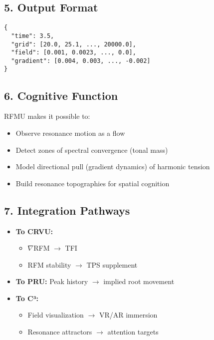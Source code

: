 \documentclass{article}
\begin{document}
\subsection*{5. Output Format}

\begin{verbatim}
{
  "time": 3.5,
  "grid": [20.0, 25.1, ..., 20000.0],
  "field": [0.001, 0.0023, ..., 0.0],
  "gradient": [0.004, 0.003, ..., -0.002]
}
\end{verbatim}

\subsection*{6. Cognitive Function}

RFMU makes it possible to:

\begin{itemize}
    \item Observe resonance motion as a flow
    \item Detect zones of spectral convergence (tonal mass)
    \item Model directional pull (gradient dynamics) of harmonic tension
    \item Build resonance topographies for spatial cognition
\end{itemize}

\subsection*{7. Integration Pathways}

\begin{itemize}
    \item \textbf{To CRVU:}
    \begin{itemize}
        \item $\nabla$RFM $\rightarrow$ TFI
        \item RFM stability $\rightarrow$ TPS supplement
    \end{itemize}
    \item \textbf{To PRU:} Peak history $\rightarrow$ implied root movement
    \item \textbf{To C³:}
    \begin{itemize}
        \item Field visualization $\rightarrow$ VR/AR immersion
        \item Resonance attractors $\rightarrow$ attention targets
    \end{itemize}
\end{itemize}
\end{document}

